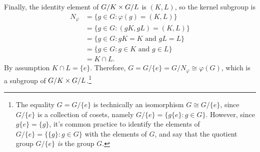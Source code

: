 \documentclass[12pt,reqno]{amsart}
\newcommand{\<}{\ensuremath{\langle}}
\renewcommand{\>}{\ensuremath{\rangle}}
\begin{document}
\begin{enumerate}
Finally, the identity element of $G/K \times G/L$ is $(K,L)$, so the kernel
subgroup is 
\begin{align*}
  N_\varphi &= \{g \in G : \varphi(g) = (K,L)\}\\
&= \{g \in G : (gK,gL) = (K,L)\}\\
&= \{g \in G : gK = K \text{ and } gL=L\}\\
&= \{g \in G : g\in K \text{ and } g\in L\}\\
&= K\cap L.
\end{align*}
By assumption $K\cap L= \{e\}$. Therefore, 
$G = G/\{e\} = G/N_\varphi \cong \varphi(G)$, which is a subgroup of $G/K \times G/L$.\footnote{The equality 
$G = G/\{e\}$ is technically an isomorphism $G \cong G/\{e\}$, 
  since $G/\{e\}$ is a collection of cosets, namely 
  $G/\{e\} = \{g\{e\} : g\in G\}$. However, since $g\{e\} = \{g\}$, it's
  common practice to identify the elements of $G/\{e\} = \{\{g\} : g\in G\}$ with the
  elements of $G$, and say that the quotient group $G/\{e\}$ \emph{is} the group
  $G$.}
\medskip

   


\end{enumerate}
\end{document}
